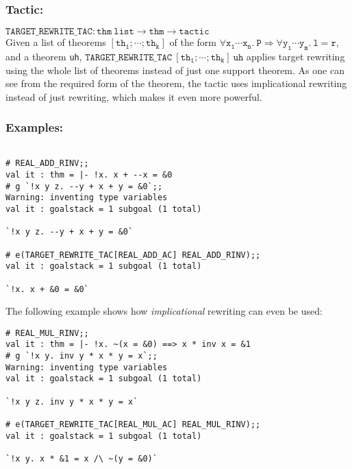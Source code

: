 \documentclass{llncs}
\newcommand*\TARGETTAC{\texttt{TARGET\_REWRITE\_TAC}\xspace}
\begin{document}
		\subsubsection{Tactic:} 
		$\mathtt{\TARGETTAC: thm\ list \to thm \to tactic}$\\
    Given a list of theorems $\mathtt{[th_1;\cdots;th_k]}$
    of the form $\mathtt{\forall x_1\cdots x_n.\ P \Rightarrow \forall y_1\cdots y_m.\ l = r}$,
    and a theorem \texttt{uh},
		$\mathtt{\TARGETTAC\ [th_1;\cdots;th_k]\ uh}$ applies target rewriting using the whole list of theorems
    instead of just one support theorem. As one can see from the required form of the theorem,
    the tactic uses implicational rewriting instead of just rewriting, which makes it even more powerful.

    \subsubsection{Examples:}
    \begin{example}
    \begin{verbatim}

# REAL_ADD_RINV;;
val it : thm = |- !x. x + --x = &0
# g `!x y z. --y + x + y = &0`;;
Warning: inventing type variables
val it : goalstack = 1 subgoal (1 total)

`!x y z. --y + x + y = &0`

# e(TARGET_REWRITE_TAC[REAL_ADD_AC] REAL_ADD_RINV);;
val it : goalstack = 1 subgoal (1 total)

`!x. x + &0 = &0` \end{verbatim}
    \end{example}

    \begin{example}
    The following example shows how \emph{implicational} rewriting can even be used:
    \begin{verbatim}
# REAL_MUL_RINV;;
val it : thm = |- !x. ~(x = &0) ==> x * inv x = &1
# g `!x y. inv y * x * y = x`;;
Warning: inventing type variables
val it : goalstack = 1 subgoal (1 total)

`!x y z. inv y * x * y = x`

# e(TARGET_REWRITE_TAC[REAL_MUL_AC] REAL_MUL_RINV);;
val it : goalstack = 1 subgoal (1 total)

`!x y. x * &1 = x /\ ~(y = &0)` \end{verbatim}    
    \end{example}
\end{document}
